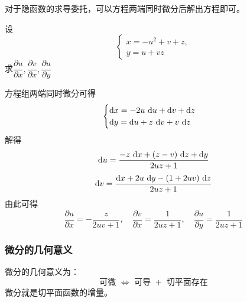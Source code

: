 对于隐函数的求导委托，可以方程两端同时微分后解出方程即可。
\begin{example}
    设
    \[
        \begin{cases}
            x=-u^2+v+z, \\
            y=u+vz
        \end{cases}
    \]
    求$\dfrac{\partial u}{\partial x}, \dfrac{\partial v}{\partial x},\dfrac{\partial u}{\partial y}$
\end{example}
\begin{solution}
    方程组两端同时微分可得
    \[
        \begin{cases}
            \diff x = -2u\,\diff u + \diff v + \diff z \\
            \diff y = \diff u + z\,\diff v + v\,\diff z
        \end{cases}
    \]
    解得
    \[ \mathop{}\!\mathrm{d} u = \frac{-z\,\mathop{}\!\mathrm{d} x + (z-v)\,\mathop{}\!\mathrm{d} z + \mathop{}\!\mathrm{d} y}{2uz + 1} \]
    \[ \mathop{}\!\mathrm{d} v = \frac{\mathop{}\!\mathrm{d} x + 2u\,\mathop{}\!\mathrm{d} y - (1+2uv)\,\mathop{}\!\mathrm{d} z}{2uz + 1} \]
    由此可得
    \[
        \frac{\partial u}{\partial x} = -\frac{z}{2uv+1},\quad
        \frac{\partial v}{\partial x} = \frac{1}{2uz+1},\quad
        \frac{\partial u}{\partial y} = \frac{1}{2uz+1}
    \]
\end{solution}

\subsubsection{微分的几何意义}
微分的几何意义为：
\[ \text{可微~} \iff \text{ 可导~}+\text{ 切平面存在} \]
微分就是切平面函数的增量。

